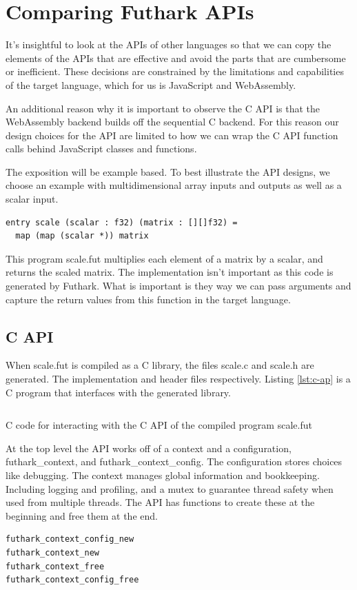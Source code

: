 \documentclass[11pt]{book}
\begin{document}
\section{Comparing Futhark APIs}

It's insightful to look at the APIs of other languages so that we can copy the elements of the APIs that are effective and avoid the parts that are cumbersome or inefficient. These decisions are constrained by the limitations and capabilities of the target language, which for us is JavaScript and WebAssembly.

An additional reason why it is important to observe the C API is that the WebAssembly backend builds off the sequential C backend. For this reason our design choices for the API are limited to how we can wrap the C API function calls behind JavaScript classes and functions.

The exposition will be example based. To best illustrate the API designs, we choose an example with multidimensional array inputs and outputs as well as a scalar input. 
\begin{verbatim}
entry scale (scalar : f32) (matrix : [][]f32) = 
  map (map (scalar *)) matrix
\end{verbatim}
This program scale.fut multiplies each element of a matrix by a scalar, and returns the scaled matrix. The implementation isn't important as this code is generated by Futhark. What is important is they way we can pass arguments and capture the return values from this function in the target language. 

\subsection{C API}
When scale.fut is compiled as a C library, the files scale.c and scale.h are generated. The implementation and header files respectively. Listing \ref{lst:c-ap} is a C program that interfaces with the generated library. 


\begin{listing}[H] 
        \inputminted[fontsize=\small,baselinestretch=0.5,linenos]{C}{code/compiler/api_examples/example.c}
                \label{lst:c-api}    
        \caption{C code for interacting with the C API of the compiled program scale.fut }
\end{listing} 

At the top level the API works off of a context and a configuration, futhark\_context, and futhark\_context\_config. The configuration stores choices like debugging. The context manages global information and bookkeeping. Including logging and profiling, and a mutex to guarantee thread safety when used from multiple threads. The API has functions to create these at the beginning and free them at the end. 
\begin{verbatim}
futhark_context_config_new
futhark_context_new
futhark_context_free
futhark_context_config_free
\end{verbatim}
\end{document}
